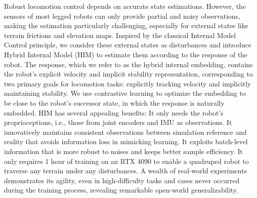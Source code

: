 Robust locomotion control depends on accurate state estimations.
However, the sensors of most legged robots can only provide partial and noisy observations, making the estimation particularly challenging, especially for external states like terrain frictions and elevation maps. 
Inspired by the classical Internal Model Control principle, we consider these external states as disturbances and introduce Hybrid Internal Model (HIM) to estimate them according to the response of the robot. 
The response, which we refer to as the hybrid internal embedding, contains the robot's explicit velocity and implicit stability representation, corresponding to two primary goals for locomotion tasks: explicitly tracking velocity and implicitly maintaining stability.
We use contrastive learning to optimize the embedding to be close to the robot's successor state, in which the response is naturally embedded. 
HIM has several appealing benefits:
It only needs the robot's proprioceptions, i.e., those from joint encoders and IMU as observations.
It innovatively maintains consistent observations between simulation reference and reality that avoids information loss in mimicking learning.  
It exploits batch-level information that is more robust to noises and keeps better sample efficiency.
It only requires 1 hour of training on an RTX 4090 to enable a quadruped robot to traverse any terrain under any disturbances.
A wealth of real-world experiments demonstrates its agility, even in high-difficulty tasks and cases never occurred during the training process, revealing remarkable open-world generalizability.